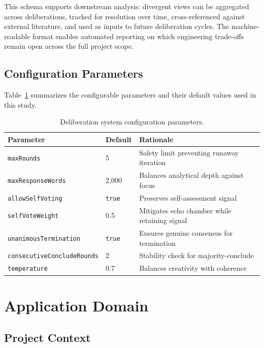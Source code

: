 \documentclass[11pt,a4paper]{article}
\begin{document}
This schema supports downstream analysis: divergent views can be aggregated across deliberations, tracked for resolution over time, cross-referenced against external literature, and used as inputs to future deliberation cycles. The machine-readable format enables automated reporting on which engineering trade-offs remain open across the full project scope.

\subsection{Configuration Parameters}
\label{sec:config}

Table~\ref{tab:config} summarizes the configurable parameters and their default values used in this study.

\begin{table}[ht]
\centering
\caption{Deliberation system configuration parameters.}
\label{tab:config}
\begin{tabular}{@{}llp{5.5cm}@{}}
\toprule
\textbf{Parameter} & \textbf{Default} & \textbf{Rationale} \\
\midrule
\texttt{maxRounds} & 5 & Safety limit preventing runaway iteration \\
\texttt{maxResponseWords} & 2{,}000 & Balances analytical depth against focus \\
\texttt{allowSelfVoting} & \texttt{true} & Preserves self-assessment signal \\
\texttt{selfVoteWeight} & 0.5 & Mitigates echo chamber while retaining signal \\
\texttt{unanimousTermination} & \texttt{true} & Ensures genuine consensus for termination \\
\texttt{consecutiveConcludeRounds} & 2 & Stability check for majority-conclude \\
\texttt{temperature} & 0.7 & Balances creativity with coherence \\
\bottomrule
\end{tabular}
\end{table}

\section{Application Domain}
\label{sec:domain}

\subsection{Project Context}
\end{document}
